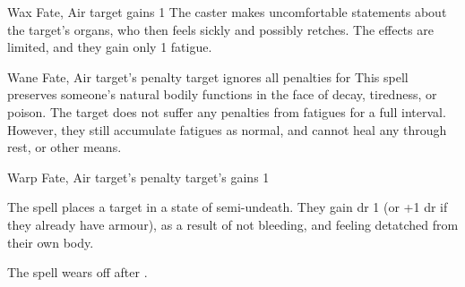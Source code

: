   {}%
  {Wax}%
  {Fate, Air}%
  {}%
  {target gains 1 }%
  {
    The caster makes uncomfortable statements about the target's organs, who then feels sickly and possibly retches.
    The effects are limited, and they gain only 1 \gls{fatigue}.
  }

  {}%
  {Wane}%
  {Fate, Air}%
  {target's  penalty}%
  {target ignores all  penalties for }%
  {
    This spell preserves someone's natural bodily functions in the face of decay, tiredness, or poison.
    The target does not suffer any penalties from \glspl{fatigue} for a full \gls{interval}.
    However, they still accumulate \glspl{fatigue} as normal, and cannot heal any through rest, or other means.
  }

  {}%
  {Warp}%
  {Fate, Air}%
  {target's  penalty}%
  {target's gains  1}%
  {
    The spell places a target in a state of semi-undeath.
    They gain \gls{dr} 1 (or +1 \gls{dr} if they already have armour), as a result of not bleeding, and feeling detatched from their own body.

    The spell wears off after .
  }

